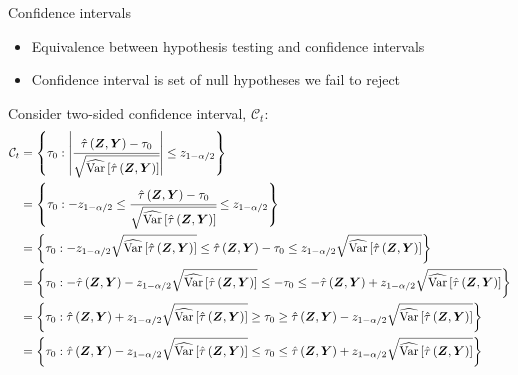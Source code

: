 \documentclass[table, xcolor = {dvipsnames}, 9pt]{beamer}
\theoremstyle{plain}
\DeclareMathOperator{\Var}{\rm{Var}}
\begin{document}
\begin{frame}{Confidence intervals}
\vfill
\begin{itemize} \vfill
\item Equivalence between hypothesis testing and confidence intervals
\item Confidence interval is set of null hypotheses we fail to reject
\end{itemize}
Consider two-sided confidence interval, $\mathcal{C}_t$:
\footnotesize
\begin{equation*}
\begin{split}
\mathcal{C}_t & = \left\{\tau_0 : \left\lvert \cfrac{\hat{\tau}\left(\bm{Z}, \bm{Y}\right)- \tau_0}{\sqrt{\widehat{\Var}\left[\hat{\tau}\left(\bm{Z}, \bm{Y}\right)\right]}} \right\rvert \leq z_{1 - \alpha/2}\right\} \\ 
& = \left\{\tau_0 : - z_{1 - \alpha/2} \leq \cfrac{\hat{\tau}\left(\bm{Z}, \bm{Y}\right)- \tau_0}{\sqrt{\widehat{\Var}\left[\hat{\tau}\left(\bm{Z}, \bm{Y}\right)\right]}} \leq z_{1 - \alpha/2} \right\} \\ 
& = \left\{\tau_0 : - z_{1 - \alpha/2} \sqrt{\widehat{\Var}\left[\hat{\tau}\left(\bm{Z}, \bm{Y}\right)\right] }\leq \hat{\tau}\left(\bm{Z}, \bm{Y}\right)- \tau_0 \leq z_{1 - \alpha/2} \sqrt{\widehat{\Var}\left[\hat{\tau}\left(\bm{Z}, \bm{Y}\right)\right] }\right\} \\ 
& = \left\{\tau_0 : -\hat{\tau}\left(\bm{Z}, \bm{Y}\right)- z_{1 - \alpha/2} \sqrt{\widehat{\Var}\left[\hat{\tau}\left(\bm{Z}, \bm{Y}\right)\right] }\leq - \tau_0 \leq - \hat{\tau}\left(\bm{Z}, \bm{Y}\right)+ z_{1 - \alpha/2} \sqrt{\widehat{\Var}\left[\hat{\tau}\left(\bm{Z}, \bm{Y}\right)\right] }\right\} \\ 
& = \left\{\tau_0 : \hat{\tau}\left(\bm{Z}, \bm{Y}\right)+ z_{1 - \alpha/2} \sqrt{\widehat{\Var}\left[\hat{\tau}\left(\bm{Z}, \bm{Y}\right)\right] }\geq \tau_0 \geq  \hat{\tau}\left(\bm{Z}, \bm{Y}\right)- z_{1 - \alpha/2} \sqrt{\widehat{\Var}\left[\hat{\tau}\left(\bm{Z}, \bm{Y}\right)\right] }\right\} \\ 
& = \left\{\tau_0 : \hat{\tau}\left(\bm{Z}, \bm{Y}\right)- z_{1 - \alpha/2} \sqrt{\widehat{\Var}\left[\hat{\tau}\left(\bm{Z}, \bm{Y}\right)\right] }\leq \tau_0 \leq \hat{\tau}\left(\bm{Z}, \bm{Y}\right)+ z_{1 - \alpha/2} \sqrt{\widehat{\Var}\left[\hat{\tau}\left(\bm{Z}, \bm{Y}\right)\right] }\right\}
\end{split}
\end{equation*}
\normalsize
\end{frame}
\end{document}
